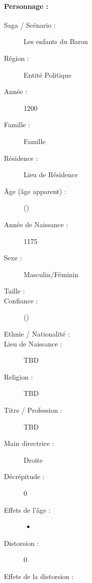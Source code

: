 \pagestyle{fancy}
\thispagestyle{plain}
{\Large \paragraph*{\Large Personnage :} \magusname}
\begin{multicols}{2}
\begin{description}
\item[Saga / Scénario :] Les enfants du Baron
\item[Région :] Entité Politique %
\item[Année :] 1200
\item[Famille :] Famille %
\item[Résidence :] Lieu de Résidence %
\item[Âge (âge apparent) :] \magusage{} (\magusapparentage)
\item[Année de Naissance :] 1175
\item[Sexe :] Masculin/Féminin
\item[Taille :] \magussize
\item[Confiance :] \magusconfidencescore{} (\magusconfidencepts)
\columnbreak
\item[Ethnie /  Nationalité :]
\item[Lieu de Naissance :] TBD
\item[Religion :] TBD
\item[Titre / Profession :] TBD
\item[Main directrice :] Droite
\vspace{-1em}
\end{description}
\end{multicols}
\begin{multicols}{2}
\begin{description}
\item[Décrépitude :] 0
\item[Effets de l'âge :]\hspace{0pt}
\begin{itemize}
\item
\end{itemize}
\columnbreak
\item[Distorsion :] 0
\item[Effets de la distorsion :]\hspace{0pt}
\magusscarslong
\end{description}
\end{multicols}
